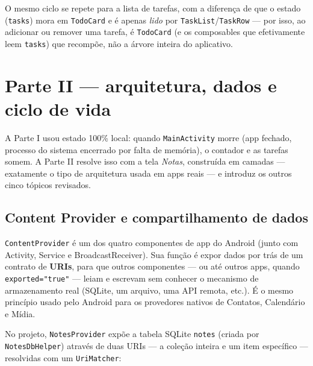 \documentclass[11pt,a4paper]{article}
\begin{document}
O mesmo ciclo se repete para a lista de tarefas, com a diferença de que
o estado (\texttt{tasks}) mora em \texttt{TodoCard} e é apenas
\emph{lido} por \texttt{TaskList}/\texttt{TaskRow} — por isso, ao
adicionar ou remover uma tarefa, é \texttt{TodoCard} (e os composables
que efetivamente leem \texttt{tasks}) que recompõe, não a árvore inteira
do aplicativo.

\section{Parte II --- arquitetura, dados e ciclo de vida}
\label{sec:parte2}

A Parte I usou estado 100\% local: quando \texttt{MainActivity} morre
(app fechado, processo do sistema encerrado por falta de memória), o
contador e as tarefas somem. A Parte II resolve isso com a tela
\emph{Notas}, construída em camadas — exatamente o tipo de arquitetura
usada em apps reais — e introduz os outros cinco tópicos revisados.

\subsection{Content Provider e compartilhamento de dados}
\label{sec:contentprovider}

\texttt{ContentProvider} é um dos quatro componentes de app do Android
(junto com Activity, Service e BroadcastReceiver). Sua função é expor
dados por trás de um contrato de \textbf{URIs}, para que outros
componentes — ou até outros apps, quando \texttt{exported="true"} — leiam
e escrevam sem conhecer o mecanismo de armazenamento real (SQLite, um
arquivo, uma API remota, etc.). É o mesmo princípio usado pelo Android
para os provedores nativos de Contatos, Calendário e Mídia.

No projeto, \texttt{NotesProvider} expõe a tabela SQLite \texttt{notes}
(criada por \texttt{NotesDbHelper}) através de duas URIs — a coleção
inteira e um item específico — resolvidas com um \texttt{UriMatcher}:
\end{document}
